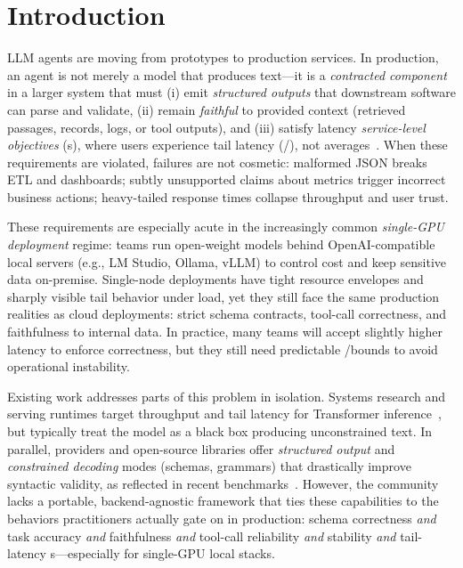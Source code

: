 \usepackage{tikz}
\usetikzlibrary{arrows.meta, positioning, shapes.geometric, calc}

\section{Introduction}

LLM agents are moving from prototypes to production services.
In production, an agent is not merely a model that produces text---it is a \emph{contracted component} in a larger system that must (i) emit \emph{structured outputs} that downstream software can parse and validate, (ii) remain \emph{faithful} to provided context (retrieved passages, records, logs, or tool outputs), and (iii) satisfy latency \emph{service-level objectives} (\slo s), where users experience tail latency (\pninetyfive/\pninetynine), not averages~\citep{dean2013tail}.
When these requirements are violated, failures are not cosmetic: malformed JSON breaks ETL and dashboards; subtly unsupported claims about metrics trigger incorrect business actions; heavy-tailed response times collapse throughput and user trust.

These requirements are especially acute in the increasingly common \emph{single-GPU deployment} regime:
teams run open-weight models behind OpenAI-compatible local servers (e.g., LM Studio, Ollama, vLLM) to control cost and keep sensitive data on-premise.
Single-node deployments have tight resource envelopes and sharply visible tail behavior under load, yet they still face the same production realities as cloud deployments: strict schema contracts, tool-call correctness, and faithfulness to internal data.
In practice, many teams will accept slightly higher latency to enforce correctness, but they still need predictable \pninetyfive/\pninetynine bounds to avoid operational instability.

Existing work addresses parts of this problem in isolation.
Systems research and serving runtimes target throughput and tail latency for Transformer inference~\citep{kwon2023vllm,zheng2023sglang,deepspeedFastGen,agrawal2024sarathi}, but typically treat the model as a black box producing unconstrained text.
In parallel, providers and open-source libraries offer \emph{structured output} and \emph{constrained decoding} modes (schemas, grammars) that drastically improve syntactic validity, as reflected in recent benchmarks~\citep{geng2025jsonschemabench,letmespeakfreely,structuredRAG}.
However, the community lacks a portable, backend-agnostic framework that ties these capabilities to the behaviors practitioners actually gate on in production:
schema correctness \emph{and} task accuracy \emph{and} faithfulness \emph{and} tool-call reliability \emph{and} stability \emph{and} tail-latency \slo s---especially for single-GPU local stacks.

